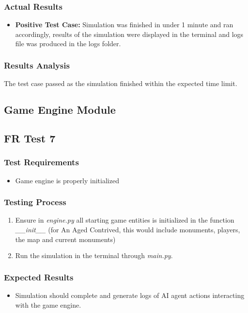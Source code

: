 \documentclass[12pt, titlepage]{article}
\providecommand{\DIFaddbegin}{} %
\providecommand{\DIFaddend}{} %
\begin{document}
\subsubsection{Actual Results}
\begin{itemize}
    \item \textbf{Positive Test Case:} Simulation was finished in under 1 minute and ran accordingly, results of the simulation were displayed in the terminal and logs file was produced in the logs folder.
\end{itemize}
\subsubsection{Results Analysis}
The test case passed as the simulation finished within the expected time limit.
\subsection{Game Engine Module}

\subsection{FR Test 7} \DIFaddbegin \label{FRT7}
\DIFaddend \subsubsection{Test Requirements}
\begin{itemize}
    \item Game engine is properly initialized
\end{itemize}
\subsubsection{Testing Process}
\begin{enumerate}
    \item Ensure in \textit{engine.py} all starting game entities is initialized in the function \textit{\_\_init\_\_} (for An Aged Contrived, this would include monuments, players, the map and current monuments)
    \item Run the simulation in the terminal through \textit{main.py}.
\end{enumerate}
\subsubsection{Expected Results}
\begin{itemize}
    \item Simulation should complete and generate logs of AI agent actions interacting with the game engine.
\end{itemize}
\end{document}
